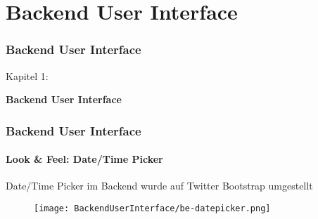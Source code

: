 %

\section{Backend User Interface}
\begin{frame}[fragile]
	\frametitle{Backend User Interface}

	\begin{center}\huge{Kapitel 1:}\end{center}
	\begin{center}\huge{\color{typo3darkgrey}\textbf{Backend User Interface}}\end{center}

\end{frame}


\begin{frame}[fragile]
	\frametitle{Backend User Interface}
	\framesubtitle{Look \& Feel: Date/Time Picker}

	Date/Time Picker im Backend wurde auf Twitter Bootstrap umgestellt
	\begin{figure}
		\texttt{[image: BackendUserInterface/be-datepicker.png]}
	\end{figure}

\end{frame}


